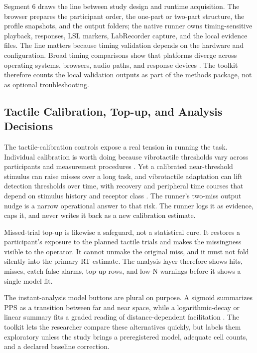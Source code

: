 \documentclass[pdflatex,sn-apa]{sn-jnl}
\begin{document}
Segment 6 draws the line between study design and runtime acquisition. The browser prepares the participant order, the one-part or two-part structure, the profile snapshots, and the output folders; the native runner owns timing-sensitive playback, responses, LSL markers, LabRecorder capture, and the local evidence files. The line matters because timing validation depends on the hardware and configuration. Broad timing comparisons show that platforms diverge across operating systems, browsers, audio paths, and response devices \citep{Bridges2020}. The toolkit therefore counts the local validation outputs as part of the methods package, not as optional troubleshooting.

\subsection{Tactile Calibration, Top-up, and Analysis Decisions}

The tactile-calibration controls expose a real tension in running the task. Individual calibration is worth doing because vibrotactile thresholds vary across participants and measurement procedures \citep{Merchel2020,Mikkelsen2020,Morioka2002,Pate2024}. Yet a calibrated near-threshold stimulus can raise misses over a long task, and vibrotactile adaptation can lift detection thresholds over time, with recovery and peripheral time courses that depend on stimulus history and receptor class \citep{Goble1993,Hollins1990,Leung2005}. The runner's two-miss output nudge is a narrow operational answer to that risk. The runner logs it as evidence, caps it, and never writes it back as a new calibration estimate.

Missed-trial top-up is likewise a safeguard, not a statistical cure. It restores a participant's exposure to the planned tactile trials and makes the missingness visible to the operator. It cannot unmake the original miss, and it must not fold silently into the primary RT estimate. The analysis layer therefore shows hits, misses, catch false alarms, top-up rows, and low-N warnings before it shows a single model fit.

The instant-analysis model buttons are plural on purpose. A sigmoid summarizes PPS as a transition between far and near space, while a logarithmic-decay or linear summary fits a graded reading of distance-dependent facilitation \citep{Canzoneri2012,Hobeika2019}. The toolkit lets the researcher compare these alternatives quickly, but labels them exploratory unless the study brings a preregistered model, adequate cell counts, and a declared baseline correction.
\end{document}
